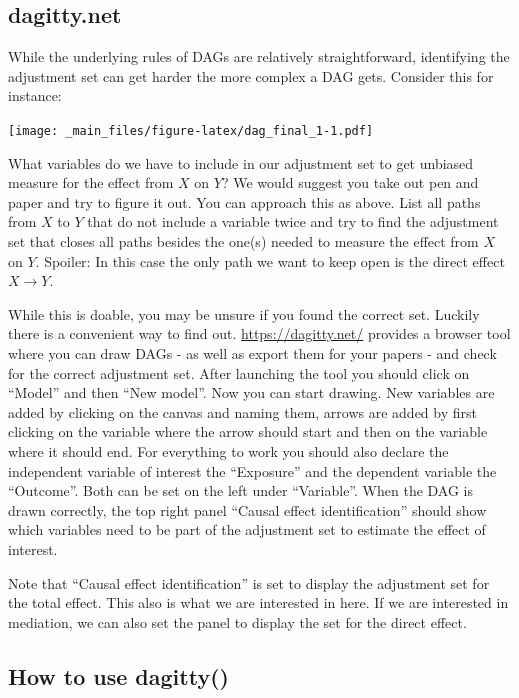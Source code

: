 \documentclass[
]{book}
\begin{document}
\hypertarget{dagitty.net}{%
\subsection{dagitty.net}\label{dagitty.net}}

While the underlying rules of DAGs are relatively straightforward,
identifying the adjustment set can get harder the more complex a DAG
gets. Consider this for instance:

\texttt{[image: \_main\_files/figure-latex/dag\_final\_1-1.pdf]}

What variables do we have to include in our adjustment set to get
unbiased measure for the effect from \(X\) on \(Y\)? We would suggest you
take out pen and paper and try to figure it out. You can approach this
as above. List all paths from \(X\) to \(Y\) that do not include a variable
twice and try to find the adjustment set that closes all paths besides
the one(s) needed to measure the effect from \(X\) on \(Y\). Spoiler: In
this case the only path we want to keep open is the direct effect
\(X \rightarrow Y\).

While this is doable, you may be unsure if you found the correct set.
Luckily there is a convenient way to find out. \url{https://dagitty.net/}
provides a browser tool where you can draw DAGs - as well as export them
for your papers - and check for the correct adjustment set. After
launching the tool you should click on ``Model'' and then ``New model''. Now
you can start drawing. New variables are added by clicking on the canvas
and naming them, arrows are added by first clicking on the variable
where the arrow should start and then on the variable where it should
end. For everything to work you should also declare the independent
variable of interest the ``Exposure'' and the dependent variable the
``Outcome''. Both can be set on the left under ``Variable''. When the DAG is
drawn correctly, the top right panel ``Causal effect identification''
should show which variables need to be part of the adjustment set to
estimate the effect of interest.

Note that ``Causal effect identification'' is set to display the
adjustment set for the total effect. This also is what we are interested
in here. If we are interested in mediation, we can also set the panel to
display the set for the direct effect.

\hypertarget{how-to-use-dagitty}{%
\subsection{How to use dagitty()}\label{how-to-use-dagitty}}
\end{document}
